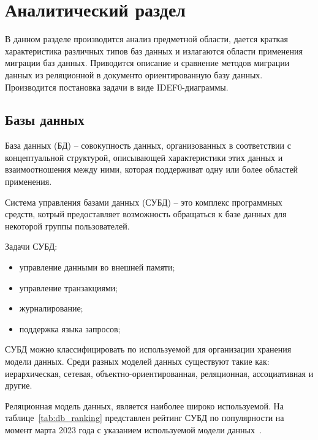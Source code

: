 \chapter{Аналитический раздел}

В данном разделе производится анализ предметной области, 
дается краткая характеристика различных типов баз данных и
излагаются области применения миграции баз данных. 
Приводится описание и сравнение методов миграции данных 
из реляционной в документо ориентированную базу данных. 
Производится постановка задачи в виде IDEF0-диаграммы.

\section{Базы данных}

База данных (БД) -- совокупность данных, организованных в соответствии
с концептуальной структурой, описывающей характеристики этих данных и
взаимоотношения между ними, которая поддерживат одну 
или более областей применения.

Система управления базами данных (СУБД) -- это комплекс программных средств,
котрый предоставляет возможность обращаться к базе данных 
для некоторой группы пользователей.

Задачи СУБД:
\begin{itemize}[label=---]
    \item управление данными во внешней памяти;
    \item управление транзакциями;
    \item журналирование;
    \item поддержка языка запросов;
\end{itemize}

СУБД можно классифицировать по используемой для организации хранения модели данных.
Среди разных моделей данных существуют такие как:
иерархическая, сетевая, объектно-ориентированная, реляционная, ассоциативная и другие.

Реляционная модель данных, является наиболее широко используемой.
На таблице~\ref{tab:db_ranking} представлен рейтинг СУБД по популярности на момент
марта 2023 года с указанием используемой модели данных~\cite{db_rating}.

\clearpage

